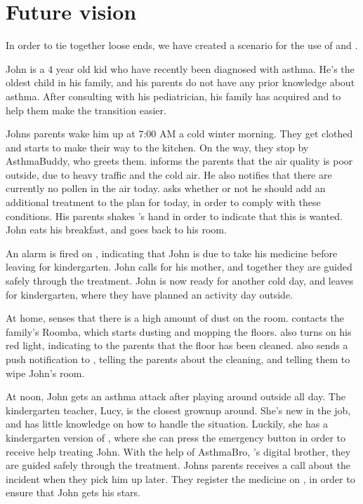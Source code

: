 \section{Future vision}

In order to tie together loose ends, we have created a scenario for the use of \app{} and \buddy{}.

John is a 4 year old kid who have recently been diagnosed with asthma. He's the oldest child in his family, and his parents do not have any prior knowledge about asthma. After consulting with his pediatrician, his family has acquired \buddy{} and \app{} to help them make the transition easier. 

Johns parents wake him up at 7:00 AM a cold winter morning. They get clothed and starts to make their way to the kitchen. On the way, they stop by AsthmaBuddy, who greets them. \buddy{} informs the parents that the air quality is poor outside, due to heavy traffic and the cold air. He also notifies that there are currently no pollen in the air today. \buddy{} asks whether or not he should add an additional treatment to the plan for today, in order to comply with these conditions. His parents shakes \buddy{}'s hand in order to indicate that this is wanted. John eats his breakfast, and goes back to his room. 

An alarm is fired on \buddy{}, indicating that John is due to take his medicine before leaving for kindergarten. John calls for his mother, and together they are guided safely through the treatment. John is now ready for another cold day, and leaves for kindergarten, where they have planned an activity day outside. 

At home, \buddy{} senses that there is a high amount of dust on the room. \buddy{} contacts the family's Roomba, which starts dusting and mopping the floors. \buddy{} also turns on his red light, indicating to the parents that the floor has been cleaned. \buddy{} also sends a push notification to \app{}, telling the parents about the cleaning, and telling them to wipe John's room. 

At noon, John gets an asthma attack after playing around outside all day. The kindergarten teacher, Lucy, is the closest grownup around. She's new in the job, and has little knowledge on how to handle the situation. Luckily, she has a kindergarten version of \app{}, where she can press the emergency button in order to receive help treating John. With the help of AsthmaBro, \buddy{}'s digital brother, they are guided safely through the treatment. Johns parents receives a call about the incident when they pick him up later. They register the medicine on \app{}, in order to ensure that John gets his stars.

